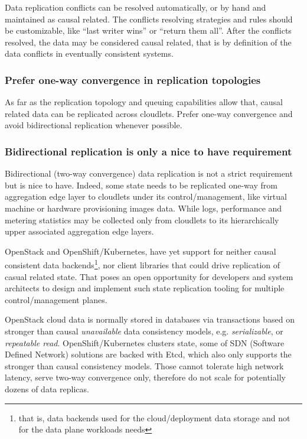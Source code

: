\documentclass[conference]{IEEEtran}
\begin{document}
Data replication conflicts can be resolved automatically, or by hand and
maintained as causal related. The conflicts resolving strategies and rules
should be customizable, like ``last writer wins'' or ``return them all''. After
the conflicts resolved, the data may be considered causal related, that is by
definition\cite{b1} of the data conflicts in eventually consistent systems.

\subsubsection{Prefer one-way convergence in replication topologies}

As far as the replication topology and queuing capabilities allow
that, causal related data can be replicated across cloudlets. Prefer one-way
convergence and avoid bidirectional replication whenever possible.

\subsubsection{Bidirectional replication is only a nice to have requirement}

Bidirectional (two-way convergence) data replication is not a strict
requirement but is nice to have. Indeed, some state needs to be replicated
one-way from aggregation edge layer to cloudlets under its control/management,
like virtual machine or hardware provisioning images data. While logs,
performance and metering statistics may be collected only from cloudlets to its
hierarchically upper associated aggregation edge layers.

OpenStack and OpenShift/Kubernetes, have yet support for neither causal
consistent data backends\footnote{that is, data backends used for the
cloud/deployment data storage and not for the data plane workloads needs}, nor
client libraries that could drive replication of casual related state. That
poses an open opportunity for developers and system architects to design and
implement such state replication tooling for multiple control/management
planes.

OpenStack cloud data is normally stored in databases via transactions based on
stronger than causal \textit{unavailable}\cite{b4} data consistency models,
e.g. \textit{serializable}\cite{b4}, or \textit{repeatable read}\cite{b4}.
OpenShift/Kubernetes clusters state, some of SDN (Software Defined
Network) solutions are backed with Etcd, which also only supports
the stronger than causal consistency models. Those cannot tolerate high network
latency, serve two-way convergence only, therefore do not scale for potentially
dozens of data replicas.
\end{document}
